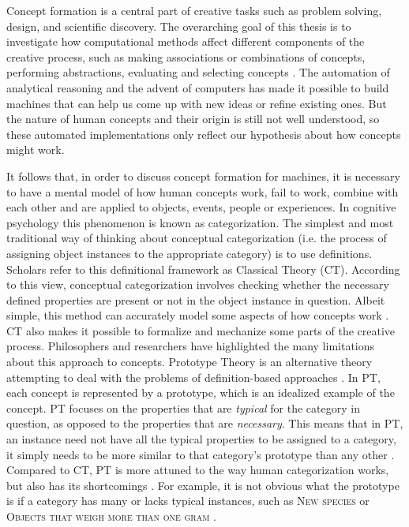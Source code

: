 Concept formation is a central part of creative tasks such as problem solving, design, and scientific discovery. The overarching goal of this thesis is to investigate how computational methods affect different components of the creative process, such as making associations or combinations of concepts, performing abstractions, evaluating and selecting concepts \citep{Hoorn2014,Hoorn2023}. The automation of analytical reasoning and the advent of computers has made it possible to build machines that can help us come up with new ideas or refine existing ones. But the nature of human concepts and their origin is still not well understood, so these automated implementations only reflect our hypothesis about how concepts might work.

It follows that, in order to discuss concept formation for machines, it is necessary to have a mental model of how human concepts work, fail to work, combine with each other and are applied to objects, events, people or experiences. In cognitive psychology this phenomenon is known as categorization. The simplest and most traditional way of thinking about conceptual categorization (i.e. the process of assigning object instances to the appropriate category) is to use definitions. Scholars refer to this definitional framework as Classical Theory (CT). According to this view, conceptual categorization involves checking whether the necessary defined properties are present or not in the object instance in question. Albeit simple, this method can accurately model some aspects of how concepts work \citep{Laurence1999}. CT also makes it possible to formalize and mechanize some parts of the creative process. Philosophers and researchers have highlighted the many limitations about this approach to concepts. Prototype Theory is an alternative theory attempting to deal with the problems of definition-based approaches \citep{Rosch1975,Rosch1978,Murphy1985,Smith1981,Medin1989}. In PT, each concept is represented by a prototype, which is an idealized example of the concept. PT focuses on the properties that are \emph{typical} for the category in question, as opposed to the properties that are \emph{necessary}. This means that in PT, an instance need not have all the typical properties to be assigned to a category, it simply needs to be more similar to that category's prototype than any other \citep{Wittgenstein1953}. Compared to CT, PT is more attuned to the way human categorization works, but also has its shortcomings \citep{Laurence1999,Osherson1981}. For example, it is not obvious what the prototype is if a category has many or lacks typical instances, such as \textsc{New species} or \textsc{Objects that weigh more than one gram} \citep{Laurence1999}.

